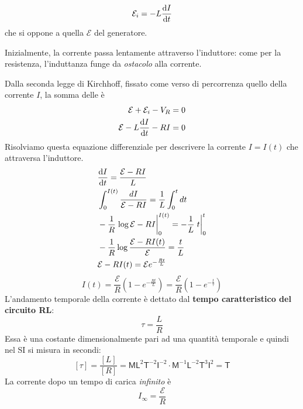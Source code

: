 \begin{equation*}
	\mathcal{E}_i=-L\dv{I}{t}
\end{equation*}
che si oppone a quella $\mathcal{E}$ del generatore.
\begin{observe}
	Inizialmente, la corrente passa lentamente attraverso l'induttore: come per la resistenza, l'induttanza funge da \textit{ostacolo} alla corrente.
\end{observe}
Dalla seconda legge di Kirchhoff, fissato come verso di percorrenza quello della corrente $I$, la somma delle \ddp è
\begin{align*}
	\mathcal{E}+\mathcal{E}_i-V_R=0\\
	\mathcal{E}-L\dv{I}{t}-RI=0
\end{align*}
Risolviamo questa equazione differenziale per descrivere la corrente $I=I(t)$ che attraversa l'induttore.
\begin{align*}%
	&\dv{I}{t}=\frac{\mathcal{E}-RI}{L}\\ &\int_{0}^{I(t)}\frac{dI}{\mathcal{E}-RI}=\frac{1}{L}\int_{0}^{t}dt\\
	&-\frac{1}{R}\eval{\log{\mathcal{E}-RI}}_{0}^{I(t)}=-\frac{1}{L}\eval{t}_{0}^{t}\\
	&-\frac{1}{R}\log{\frac{\mathcal{E}-RI(t)}{\mathcal{E}}}=\frac{t}{L}\\
	&\mathcal{E}-RI(t)=\mathcal{E}e^{-\frac{Rt}{L}}
\end{align*}
\begin{equation}
	I(t)=\frac{\mathcal{E}}{R}\left(1-e^{-\frac{Rt}{L}}\right)=\frac{\mathcal{E}}{R}\left(1-e^{-\frac{t}{\tau}}\right)
\end{equation}
L'andamento temporale della corrente è dettato dal \textbf{tempo caratteristico del circuito RL}:
\begin{equation}
	\tau=\frac{L}{R}
\end{equation}
Essa è una costante dimensionalmente pari ad una quantità temporale e quindi nel SI si misura in secondi:
\begin{equation*}
	\left[\tau\right]=\frac{\left[L\right]}{\left[R\right]}=\mathsf{M} \mathsf{L}^2 \mathsf{T}^{-2} \mathsf{I}^{-2}\cdot \mathsf{M}^{-1} \mathsf{L}^{-2}  \mathsf{T}^3 \mathsf{I}^{2}=\mathsf{T}
\end{equation*}
La corrente dopo un tempo di carica \textit{infinito} è 
\begin{equation}
	I_{\infty}=\frac{\mathcal{E}}{R}
\end{equation}

